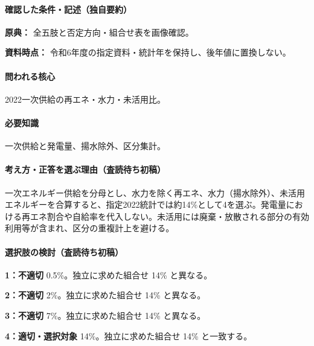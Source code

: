 \paragraph{確認した条件・記述（独自要約）}\mbox{}\par

\noindent\textbf{原典：} 全五肢と否定方向・組合せ表を画像確認。\par

\noindent\textbf{資料時点：} 令和6年度の指定資料・統計年を保持し、後年値に置換しない。\par

\paragraph{問われる核心} 2022一次供給の再エネ・水力・未活用比。

\paragraph{必要知識} 一次供給と発電量、揚水除外、区分集計。

\paragraph{考え方・正答を選ぶ理由（査読待ち初稿）} 一次エネルギー供給を分母とし、水力を除く再エネ、水力（揚水除外）、未活用エネルギーを合算すると、指定2022統計では約14\%として4を選ぶ。発電量における再エネ割合や自給率を代入しない。未活用には廃棄・放散される部分の有効利用等が含まれ、区分の重複計上を避ける。

\paragraph{選択肢の検討（査読待ち初稿）}\mbox{}\par

\noindent\textbf{1：不適切} 0.5\%。独立に求めた組合せ 14\% と異なる。\par

\noindent\textbf{2：不適切} 2\%。独立に求めた組合せ 14\% と異なる。\par

\noindent\textbf{3：不適切} 7\%。独立に求めた組合せ 14\% と異なる。\par

\noindent\textbf{4：適切・選択対象} 14\%。独立に求めた組合せ 14\% と一致する。\par

